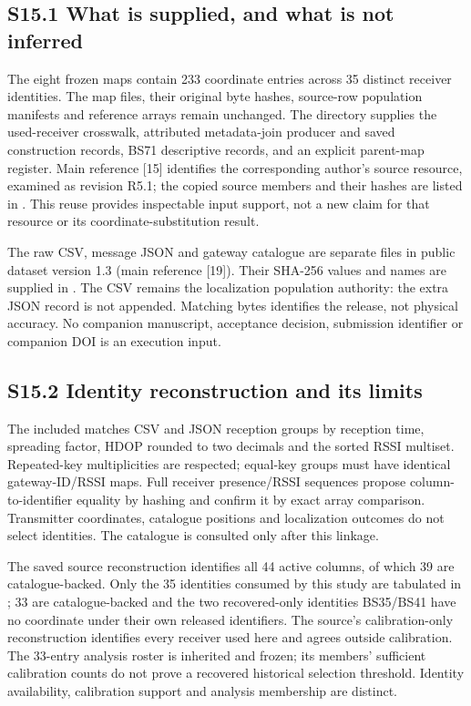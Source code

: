\documentclass[journal,onecolumn,10pt]{IEEEtran}
\begin{document}
\subsection*{S15.1 What is supplied, and what is not inferred}
The eight frozen maps contain 233 coordinate entries across 35 distinct receiver identities. The map files, their original byte hashes, source-row population manifests and reference arrays remain unchanged. The directory  supplies the used-receiver crosswalk, attributed metadata-join producer and saved construction records, BS71 descriptive records, and an explicit parent-map register. Main reference [15] identifies the corresponding author's source resource, examined as revision R5.1; the copied source members and their hashes are listed in . This reuse provides inspectable input support, not a new claim for that resource or its coordinate-substitution result.

The raw CSV, message JSON and gateway catalogue are separate files in public dataset version 1.3 (main reference [19]). Their SHA-256 values and names are supplied in . The CSV remains the localization population authority: the extra JSON record is not appended. Matching bytes identifies the release, not physical accuracy. No companion manuscript, acceptance decision, submission identifier or companion DOI is an execution input.

\subsection*{S15.2 Identity reconstruction and its limits}
The included  matches CSV and JSON reception groups by reception time, spreading factor, HDOP rounded to two decimals and the sorted RSSI multiset. Repeated-key multiplicities are respected; equal-key groups must have identical gateway-ID/RSSI maps. Full receiver presence/RSSI sequences propose column-to-identifier equality by hashing and confirm it by exact array comparison. Transmitter coordinates, catalogue positions and localization outcomes do not select identities. The catalogue is consulted only after this linkage.

The saved source reconstruction identifies all 44 active columns, of which 39 are catalogue-backed. Only the 35 identities consumed by this study are tabulated in ; 33 are catalogue-backed and the two recovered-only identities BS35/BS41 have no coordinate under their own released identifiers. The source's calibration-only reconstruction identifies every receiver used here and agrees outside calibration. The 33-entry analysis roster is inherited and frozen; its members' sufficient calibration counts do not prove a recovered historical selection threshold. Identity availability, calibration support and analysis membership are distinct.
\end{document}
